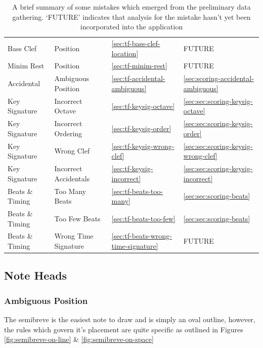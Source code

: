 \begin{table}[H]
\begin{tabularx}{\textwidth}{ llll }
        Bass Clef       & Position               & \cref{sec:tf-bass-clef-location}          & FUTURE \\
        Minim Rest      & Position               & \cref{sec:tf-minim-rest}                  & FUTURE \\
        Accidental      & Ambiguous Position     & \cref{sec:tf-accidental-ambiguous}        & \cref{sec:scoring-accidental-ambiguous} \\
        Key Signature   & Incorrect Octave       & \cref{sec:tf-keysig-octave}               & \cref{sec:sec:scoring-keysig-octave} \\
        Key Signature   & Incorrect Ordering     & \cref{sec:tf-keysig-order}                & \cref{sec:sec:scoring-keysig-order} \\
        Key Signature   & Wrong Clef             & \cref{sec:tf-keysig-wrong-clef}           & \cref{sec:sec:scoring-keysig-wrong-clef} \\
        Key Signature   & Incorrect Accidentals  & \cref{sec:tf-keysig-incorrect}            & \cref{sec:sec:scoring-keysig-incorrect} \\
        Beats \& Timing & Too Many Beats         & \cref{sec:tf-beats-too-many}              & \cref{sec:sec:scoring-beats}\\
        Beats \& Timing & Too Few Beats          & \cref{sec:tf-beats-too-few}               & \cref{sec:sec:scoring-beats}\\
        Beats \& Timing & Wrong Time Signature   & \cref{sec:tf-beats-wrong-time-signature}  & FUTURE \\

        \bottomrule
    \end{tabularx}
    \caption{A brief summary of some mistakes which emerged from the preliminary data gathering. `FUTURE' indicates that analysis for the mistake hasn't yet been incorporated into the application}
    \label{table:teacher-feedback-summary}
\end{table}

\subsection{Note Heads}
\subsubsection{Ambiguous Position}\label{sec:tf-note-head-ambiguous}

The semibreve is the easiest note to draw and is simply an oval outline, however, the rules which govern it's placement are quite specific as outlined in Figures \cref{fig:semibreve-on-line} \& \cref{fig:semibreve-on-space}

